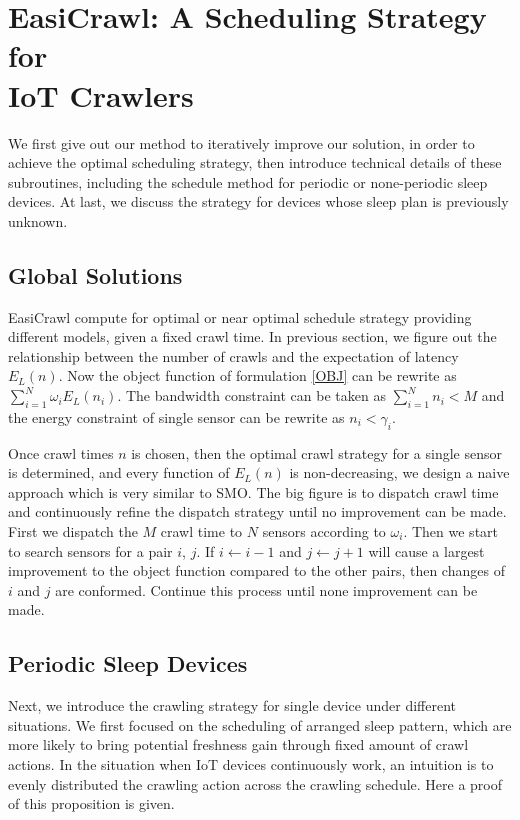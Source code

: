 \documentclass[conference]{IEEEtran}
\begin{document}
\section{EasiCrawl: A Scheduling Strategy for\\IoT Crawlers}

We first give out our method to iteratively improve our solution, in order to achieve the optimal scheduling strategy, then introduce technical details of these subroutines, including the schedule method for periodic or none-periodic sleep devices. At last, we discuss the strategy for devices whose sleep plan is previously unknown.

\subsection{Global Solutions}
EasiCrawl compute for optimal or near optimal schedule strategy providing different models, given a fixed crawl time.
In previous section, we figure out the relationship between the number of crawls and the expectation of latency $E_L(n)$. 
Now the object function of formulation \ref{OBJ} can be rewrite as $\sum_{i=1}^{N} \omega_i E_L(n_i)$. The bandwidth constraint can be taken as $\sum_{i=1}^{N} n_i < M$ and the energy constraint of single sensor can be rewrite as $n_i<\gamma_i$.


Once crawl times $n$ is chosen, then the optimal crawl strategy for a single sensor is determined, and every function of $E_L(n)$ is non-decreasing,  we design a naive approach which is very similar to SMO\cite{Platt1998}. 
The big figure is to dispatch crawl time and continuously refine the dispatch strategy until no improvement can be made.
First we dispatch the $M$ crawl time to $N$ sensors according to $\omega_i$. Then we start to search sensors for a pair $i$, $j$. If $i\gets i-1$ and $j\gets j+1$ will cause a largest improvement to the object function compared to the other pairs, then changes of $i$ and $j$ are conformed. Continue this process until none improvement can be made.

\subsection{Periodic Sleep Devices}

Next, we introduce the crawling strategy for single device under different situations.
We first focused on the scheduling of arranged sleep pattern, which are more likely to bring potential freshness gain through fixed amount of crawl actions.
In the situation when IoT devices continuously work, an intuition is to evenly distributed the crawling action across the crawling schedule. Here a proof of this proposition is given.
\end{document}
